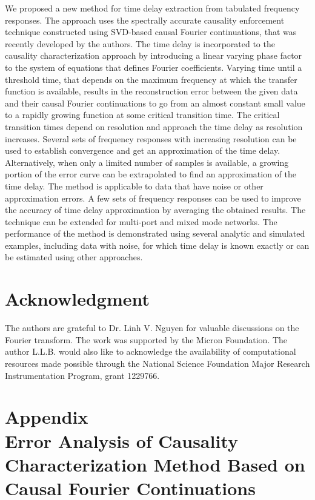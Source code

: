 \documentclass[journal,twoside]{IEEEtran}
\begin{document}
We proposed a new method for time delay extraction from tabulated frequency responses. The approach uses
 the spectrally accurate causality enforcement technique constructed using SVD-based causal Fourier continuations, that was recently developed by the authors. The  time delay is incorporated to the causality characterization approach by introducing a linear varying phase factor to the system of equations that defines Fourier coefficients. Varying time until a threshold time, that depends on the maximum frequency at which the transfer function is available, results in the reconstruction error between the given data and their causal Fourier continuations to go from an almost constant small value to a rapidly growing function at some critical transition time. The critical transition times depend on resolution and approach the time delay as resolution increases. Several sets of frequency responses with increasing resolution can be used to establish convergence and get an approximation of the time delay. Alternatively, when only a limited number of samples is available, a growing portion of the error curve can be extrapolated to find an approximation of the time delay. The method is applicable to data that have noise or other approximation errors. A few sets of frequency responses can be used to improve the accuracy of time delay approximation by averaging the obtained results. The technique can be extended for multi-port and mixed  mode networks.
The performance of the method is demonstrated using several analytic and simulated examples, including data with noise, for which time delay is known exactly or can be estimated using other approaches. 

\section*{Acknowledgment}

The authors are grateful to Dr. Linh V. Nguyen for valuable discussions on the Fourier transform. 
The work was supported by the Micron Foundation. 
The author L.L.B. would also  like to acknowledge the availability of computational resources made possible through the National Science Foundation Major Research Instrumentation Program, grant 1229766.

\section*{Appendix \\[7pt]
Error Analysis of Causality Characterization Method Based on Causal Fourier Continuations} \label{appendix}
\end{document}
